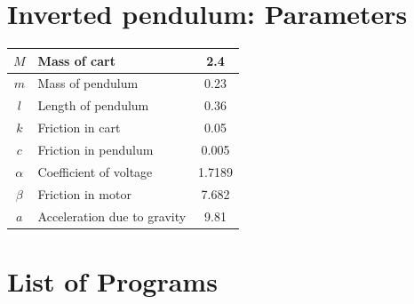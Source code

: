 \documentclass[12pt]{article}
\begin{document}
\section{Inverted pendulum: Parameters}

\begin{center}
\begin{tabular}{|c|l|c|}
\hline
$M$ & Mass of cart &  2.4  \\
\hline
$m$ & Mass of pendulum &  0.23 \\
\hline
$l$ & Length of pendulum & 0.36 \\
\hline
$k$ & Friction in cart & 0.05 \\
\hline
$c$ & Friction in pendulum & 0.005 \\
\hline
$\alpha$ & Coefficient of voltage & 1.7189 \\
\hline
$\beta$ &  Friction in motor &  7.682 \\
\hline
$a$ & Acceleration due to gravity & 9.81 \\
\hline
\end{tabular}
\end{center}

\section{List of Programs}
\end{document}
